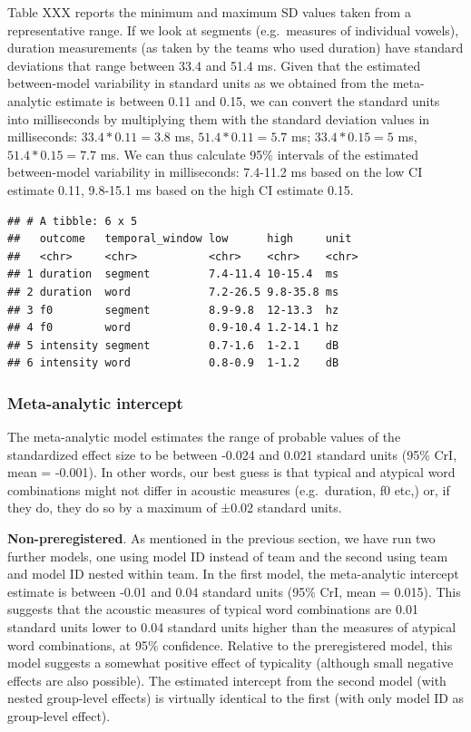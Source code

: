 \documentclass[Review,times,sageh]{sagej}
\begin{document}
Table XXX reports the minimum and maximum SD values taken from a representative range.
If we look at segments (e.g.~measures of individual vowels), duration measurements (as taken by the teams who used duration) have standard deviations that range between 33.4 and 51.4 ms.
Given that the estimated between-model variability in standard units as we obtained from the meta-analytic estimate is between 0.11 and 0.15, we can convert the standard units into milliseconds by multiplying them with the standard deviation values in milliseconds: \(33.4 * 0.11 = 3.8\) ms, \(51.4 * 0.11 = 5.7\) ms; \(33.4 * 0.15 = 5\) ms, \(51.4 * 0.15 = 7.7\) ms.
We can thus calculate 95\% intervals of the estimated between-model variability in milliseconds: 7.4-11.2 ms based on the low CI estimate 0.11, 9.8-15.1 ms based on the high CI estimate 0.15.

\begin{verbatim}
## # A tibble: 6 x 5
##   outcome   temporal_window low      high     unit 
##   <chr>     <chr>           <chr>    <chr>    <chr>
## 1 duration  segment         7.4-11.4 10-15.4  ms   
## 2 duration  word            7.2-26.5 9.8-35.8 ms   
## 3 f0        segment         8.9-9.8  12-13.3  hz   
## 4 f0        word            0.9-10.4 1.2-14.1 hz   
## 5 intensity segment         0.7-1.6  1-2.1    dB   
## 6 intensity word            0.8-0.9  1-1.2    dB
\end{verbatim}

\hypertarget{meta-analytic-intercept}{%
\subsubsection{Meta-analytic intercept}\label{meta-analytic-intercept}}

The meta-analytic model estimates the range of probable values of the standardized effect size to be between -0.024 and 0.021 standard units (95\% CrI, mean = -0.001).
In other words, our best guess is that typical and atypical word combinations might not differ in acoustic measures (e.g.~duration, f0 etc,) or, if they do, they do so by a maximum of ±0.02 standard units.

\textbf{Non-preregistered}. As mentioned in the previous section, we have run two further models, one using model ID instead of team and the second using team and model ID nested within team.
In the first model, the meta-analytic intercept estimate is between -0.01 and 0.04 standard units (95\% CrI, mean = 0.015).
This suggests that the acoustic measures of typical word combinations are 0.01 standard units lower to 0.04 standard units higher than the measures of atypical word combinations, at 95\% confidence.
Relative to the preregistered model, this model suggests a somewhat positive effect of typicality (although small negative effects are also possible).
The estimated intercept from the second model (with nested group-level effects) is virtually identical to the first (with only model ID as group-level effect).
\end{document}
